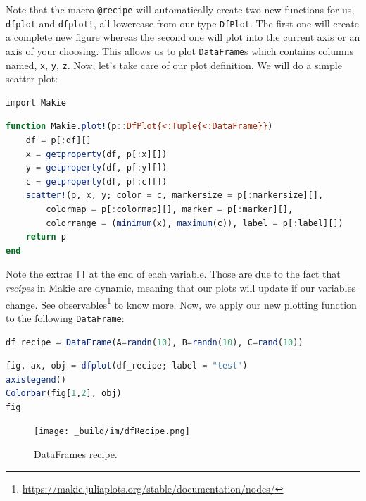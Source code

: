 \documentclass[
  notoc %
]{tufte-book}
\DeclareRobustCommand{\href}[2]{#2\footnote{\url{#1}}}
\newcommand{\passthrough}[1]{#1}
\begin{document}
Note that the macro \passthrough{\lstinline!@recipe!} will automatically
create two new functions for us, \passthrough{\lstinline!dfplot!} and
\passthrough{\lstinline"dfplot!"}, all lowercase from our type
\passthrough{\lstinline!DfPlot!}. The first one will create a complete
new figure whereas the second one will plot into the current axis or an
axis of your choosing. This allows us to plot
\passthrough{\lstinline!DataFrame!}s which contains columns named,
\passthrough{\lstinline!x!}, \passthrough{\lstinline!y!},
\passthrough{\lstinline!z!}. Now, let's take care of our plot
definition. We will do a simple scatter plot:

\begin{lstlisting}
import Makie
\end{lstlisting}

\begin{lstlisting}[language=Julia]
function Makie.plot!(p::DfPlot{<:Tuple{<:DataFrame}})
    df = p[:df][]
    x = getproperty(df, p[:x][])
    y = getproperty(df, p[:y][])
    c = getproperty(df, p[:c][])
    scatter!(p, x, y; color = c, markersize = p[:markersize][],
        colormap = p[:colormap][], marker = p[:marker][],
        colorrange = (minimum(x), maximum(c)), label = p[:label][])
    return p
end
\end{lstlisting}

Note the extras \passthrough{\lstinline![]!} at the end of each
variable. Those are due to the fact that \emph{recipes} in Makie are
dynamic, meaning that our plots will update if our variables change. See
\href{https://makie.juliaplots.org/stable/documentation/nodes/}{observables}
to know more. Now, we apply our new plotting function to the following
\passthrough{\lstinline!DataFrame!}:

\begin{lstlisting}[language=Julia]
df_recipe = DataFrame(A=randn(10), B=randn(10), C=rand(10))
\end{lstlisting}

\begin{lstlisting}[language=Julia]
fig, ax, obj = dfplot(df_recipe; label = "test")
axislegend()
Colorbar(fig[1,2], obj)
fig
\end{lstlisting}

\begin{figure}
\hypertarget{fig:dfRecipe}{%
\centering
\texttt{[image: \_build/im/dfRecipe.png]}
\caption{DataFrames recipe.}\label{fig:dfRecipe}
}
\end{figure}
\end{document}
